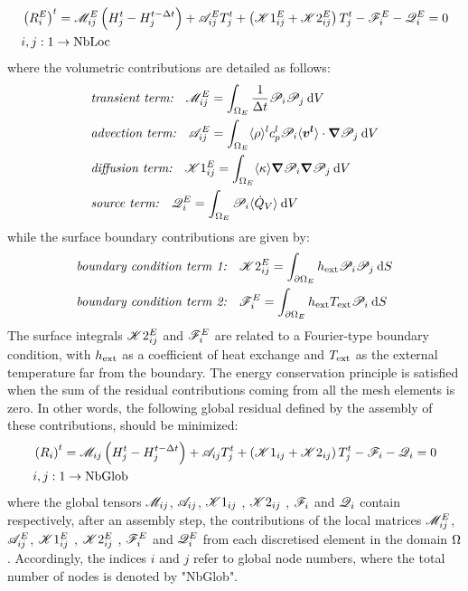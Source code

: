 \begin{align}
\begin{split}
\label{eq:discretise_residual_local}
& \left( R_i^E \right)^t = \mathscr{M}_{ij}^E \left( H_j^t - H_j^{t-\Delta t} \right) + \mathscr{A}_{ij}^E T_j^t + \left( \mathscr{K}1_{ij}^E + \mathscr{K}2_{ij}^E \right)T_j^t -\mathscr{F}_{i}^E - \mathscr{Q}_{i}^E=0 \\
& i,j:1 \rightarrow \text{NbLoc}
\end{split}
\end{align}
where the volumetric contributions are detailed as follows:
\begin{align}
& \textit{transient term:} \quad  \mathscr{M}_{ij}^E = \int_{\Omega_E} \frac{1}{\Delta t} \mathscr{P}_i \mathscr{P}_j \: \mathrm{d}V \\ 
& \textit{advection term:} \quad  \mathscr{A}_{ij}^E = \int_{\Omega_E} \langle \rho \rangle^l c_p^l \mathscr{P}_i \langle \boldsymbol{v^l} \rangle \cdot \boldsymbol{\nabla} \mathscr{P}_j\: \mathrm{d}V \\ 
& \textit{diffusion term:} \quad  \mathscr{K}1_{ij}^E = \int_{\Omega_E} \langle \kappa \rangle \boldsymbol{\nabla} \mathscr{P}_i\boldsymbol{\nabla} \mathscr{P}_j\: \mathrm{d}V \\ 
& \textit{source term:} \quad  \mathscr{Q}_{i}^E = \int_{\Omega_E} \mathscr{P}_i \langle \dot{Q}_{{V}} \rangle\: \mathrm{d}V
\end{align}
while the surface boundary contributions are given by:
\begin{align}
& \textit{boundary condition term 1:}	\quad  \mathscr{K}2_{ij}^E = \int_{\partial \Omega_E} h_{\text{ext}} \mathscr{P}_i \mathscr{P}_j\: \mathrm{d}S \\ 
& \textit{boundary condition term 2:}	\quad	\mathscr{F}_{i}^E = \int_{\partial \Omega_E} h_{\text{ext}} T_{\text{ext}} \mathscr{P}_i\: \mathrm{d}S \\
\end{align}
%
The surface integrals $\mathscr{K}2_{ij}^E$ and $\mathscr{F}_{i}^E$ are related to a Fourier-type boundary condition, 
with $h_{\text{ext}}$ as a coefficient of heat exchange and $T_{\text{ext}}$ as the external temperature far from the 
boundary. The energy conservation principle is satisfied when the sum of the residual contributions 
coming from all the mesh elements is zero. In other words, the following global residual defined by 
the assembly of these contributions, should be minimized: 
\begin{align}
\begin{split}
\label{eq:discretise_residual_global}
& \left( R_i \right)^t = \mathscr{M}_{ij} \left( H_j^t - H_j^{t-\Delta t} \right) + \mathscr{A}_{ij} T_j^t + \left( \mathscr{K}1_{ij} + \mathscr{K}2_{ij} \right)T_j^t -\mathscr{F}_{i} - \mathscr{Q}_{i}=0 \\
& i,j:1 \rightarrow \text{NbGlob}
\end{split}
\end{align}
where the global tensors $\mathscr{M}_{ij}$, $\mathscr{A}_{ij}$, $\mathscr{K}1_{ij}$ , $\mathscr{K}2_{ij}$ , $\mathscr{F}_{i}$ and $\mathscr{Q}_{i}$ contain respectively, after an assembly step, 
the contributions of the local matrices $\mathscr{M}_{ij}^E$, $\mathscr{A}_{ij}^E$, $\mathscr{K}1_{ij}^E$ , $\mathscr{K}2_{ij}^E$ , $\mathscr{F}_{i}^E$ and $\mathscr{Q}_{i}^E$ from each discretised 
element in the domain $\Omega$. Accordingly, the indices $i$ and $j$ refer to global node numbers, where the total number of nodes is 
denoted by "NbGlob". 

